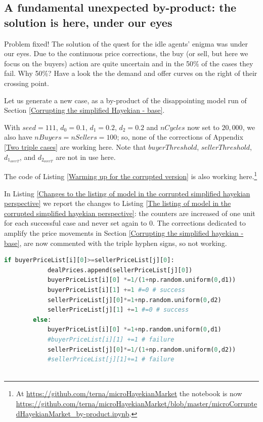 \documentclass[10pt]{report}
\begin{document}
\begin{appendices}
\section{A fundamental unexpected by-product: the solution is here, under our eyes}
\label{Corrupting the simplified Hayekian - by-product}

Problem fixed! The solution of the quest for the idle agents' enigma was under our eyes. Due to the continuous price corrections, the buy (or sell, but here we focus on the buyers) action are quite uncertain and in the 50\% of the cases they fail. Why 50\%? Have a look the the demand and offer curves on the right of their crossing point.

Let us generate a new case, as a by-product of the disappointing  model run of Section \ref{Corrupting the simplified Hayekian - base}.

With $seed=111$,  $d_0=0.1$, $d_1=0.2$, $d_2=0.2$ and $nCycles$ now set to $20,000$, we also have $nBuyers=nSellers=100$; so, none of the corrections of Appendix \ref{Two triple cases} are working here. Note that $buyerThreshold$, $sellerThreshold$, $d_{1_{overT}}$, and $d_{2_{overT}}$ are not in use here.

The code of Listing \ref{Warming up for the corrupted version} is also working here.\footnote{At \url{https://github.com/terna/microHayekianMarket} the notebook is now \url{https://github.com/terna/microHayekianMarket/blob/master/microCorruptedHayekianMarket_by-product.ipynb}.}

In Listing \ref{Changes to the listing of model in the corrupted simplified hayekian perspective} we report the changes to Listing \ref{The listing of model in the corrupted simplified hayekian perspective}: the counters are increased of one unit for each successful case and never set again to $0$. The corrections dedicated to amplify the price movements in Section \ref{Corrupting the simplified hayekian - base}, are now commented with the triple hyphen signs, so not working.

\begin{lstlisting}[language=Python, caption=Changes to the listing of model in the corrupted simplified hayekian perspective, label={Changes to the listing of model in the corrupted simplified hayekian perspective},basicstyle=\ttfamily\footnotesize]
        if buyerPriceList[i][0]>=sellerPriceList[j][0]:
            dealPrices.append(sellerPriceList[j][0])
            buyerPriceList[i][0] *=1/(1+np.random.uniform(0,d1))
            buyerPriceList[i][1] +=1 #=0 # success
            sellerPriceList[j][0]*=1+np.random.uniform(0,d2)
            sellerPriceList[j][1] +=1 #=0 # success
        else:
            buyerPriceList[i][0] *=1+np.random.uniform(0,d1)
            #buyerPriceList[i][1] +=1 # failure
            sellerPriceList[j][0]*=1/(1+np.random.uniform(0,d2))
            #sellerPriceList[j][1]+=1 # failure
            

\end{lstlisting}
\end{appendices}
\end{document}
